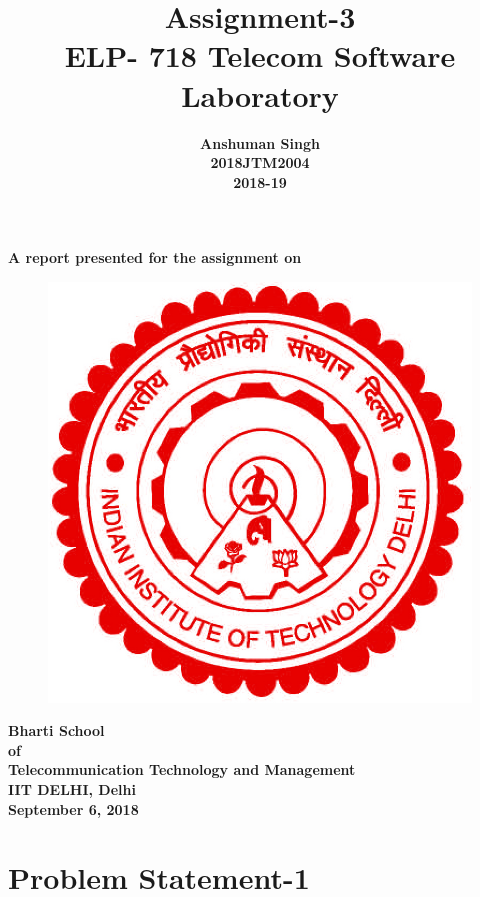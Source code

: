 \documentclass[12pt]{article}
\author{\textbf{Anshuman Singh} \\ \textbf{2018JTM2004}\\ \textbf{2018-19}}
\date{}
\title{\textbf{Assignment-3\\ELP- 718 Telecom Software Laboratory}}
\begin{document}
	\maketitle
	
	\begin{center}
	\noindent \textbf{A report presented for the assignment on\\ }
	\vspace{1cm}
	
	\begin{figure}[h]
	\centering
	\includegraphics[scale=.2]{iitd.jpg}
	
	
	\end{figure}
	\vspace{1.5cm}
	
	\textbf{Bharti School\\of\\Telecommunication Technology and Management\\IIT DELHI, Delhi\\September 6, 2018}
	
	\end{center}
	
	\newpage
	\tableofcontents
	\listoffigures
	\newpage
	
	\section{Problem Statement-1}
	
\end{document}
